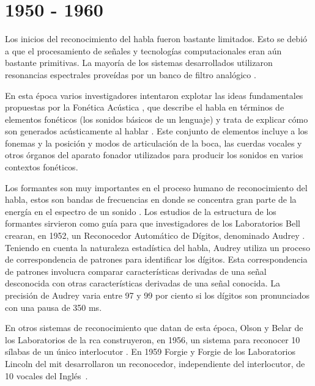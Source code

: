 \section{1950 - 1960}
\label{sec:50s}

Los inicios del reconocimiento del habla fueron bastante limitados. Esto se debi\'o a que el procesamiento 
de se\~{n}ales y tecnolog\'{i}as computacionales eran a\'un bastante primitivas. 
La mayor\'{i}a de los sistemas desarrollados utilizaron resonancias espectrales prove\'{i}das por 
un banco de filtro anal\'{o}gico \cite{Furui50Years2004}.
 
En esta \'{e}poca varios investigadores intentaron
explotar las ideas fundamentales propuestas por la Fon\'{e}tica Ac\'{u}stica \cite{AnusuyaSpeech2009}, que
describe el habla en t\'{e}rminos de elementos fon\'{e}ticos (los sonidos b\'{a}sicos de un lenguaje) y trata de
explicar c\'{o}mo son generados ac\'{u}sticamente al hablar \cite{JuangAutomaticSpeech}. 
Este conjunto de elementos incluye a los fonemas y la posici\'on y modos de articulaci\'on de la boca, 
las cuerdas vocales y otros \'organos del aparato fonador utilizados para producir los sonidos
en varios contextos fon\'{e}ticos.

Los formantes son muy importantes en el proceso humano de reconocimiento del habla, estos son bandas de frecuencias en 
donde se concentra gran parte de la energ\'{i}a en el espectro de un sonido \cite{HawkinsAcoustic2009}. Los estudios
de la estructura de los formantes sirvieron como gu\'{i}a para que investigadores de los Laboratorios Bell crearan,
en 1952, un Reconocedor Autom\'{a}tico de D\'{i}gitos, denominado Audrey \cite{DavisAutomatic1952}. 
Teniendo en cuenta la naturaleza estad\'{i}stica del habla, Audrey utiliza un proceso de correspondencia de patrones
para identificar los d\'{i}gitos. Esta correspondencia de patrones involucra comparar caracter\'{i}sticas derivadas
de una se\~{n}al desconocida con otras caracter\'{i}sticas derivadas de una se\~{n}al conocida. La precisi\'{o}n de
Audrey varia entre 97 y 99 por ciento si los d\'{i}gitos son pronunciados con una pausa de 350 ms.

En otros sistemas de reconocimiento que datan de esta \'{e}poca, Olson y Belar de los Laboratorios 
de la \gls{rca} construyeron, en 1956, un sistema para reconocer 10 s\'{i}labas de un \'{u}nico 
interlocutor \cite{OlsonPhonetic1956}. En 1959 Forgie y Forgie de los Laboratorios Lincoln del \gls{mit} 
desarrollaron un reconocedor, independiente del interlocutor, de 10 vocales del 
\mbox{Ingl\'{e}s \cite{ForgieResults1959}}.
